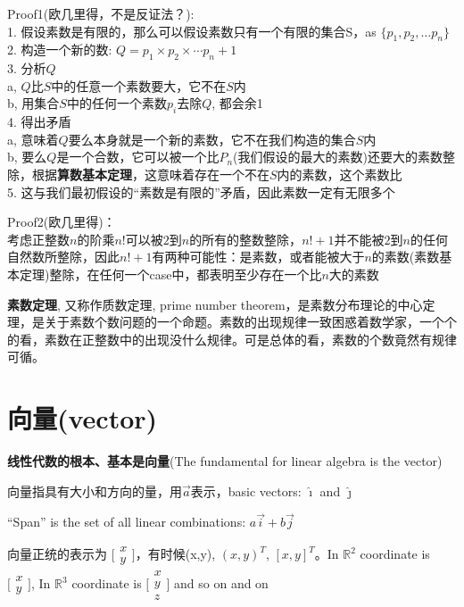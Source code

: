 \documentclass[../main.tex]{subfiles}
\begin{document}
Proof1(欧几里得，不是反证法？):\\
1. 假设素数是有限的，那么可以假设素数只有一个有限的集合S，as $\{p_1, p_2, \ldots p_n\}$\\
2. 构造一个新的数: $Q=p_1\times p_2\times \cdots p_n+1$\\
3. 分析$Q$\\
\forceindent a, $Q$比$S$中的任意一个素数要大，它不在$S$内\\
\forceindent b, 用集合$S$中的任何一个素数$p_i$去除$Q$, 都会余1\\
4. 得出矛盾\\
\forceindent a, 意味着$Q$要么本身就是一个新的素数，它不在我们构造的集合$S$内\\
\forceindent b, 要么$Q$是一个合数，它可以被一个比$P_n$(我们假设的最大的素数)还要大的素数整除，根据\textbf{算数基本定理}，这意味着存在一个不在$S$内的素数，这个素数比\\
5. 这与我们最初假设的“素数是有限的”矛盾，因此素数一定有无限多个

Proof2(欧几里得)：\\
考虑正整数$n$的阶乘$n!$可以被$2$到$n$的所有的整数整除，$n!+1$并不能被$2$到$n$的任何自然数所整除，因此$n!+1$有两种可能性：是素数，或者能被大于$n$的素数(素数基本定理)整除，在任何一个case中，都表明至少存在一个比$n$大的素数

\textbf{素数定理}, 又称作质数定理, prime number theorem，是素数分布理论的中心定理，是关于素数个数问题的一个命题。素数的出现规律一致困惑着数学家，一个个的看，素数在正整数中的出现没什么规律。可是总体的看，素数的个数竟然有规律可循。

\clearpage
\section{向量(vector)}

\textbf{线性代数的根本、基本是向量}(The fundamental for linear algebra is the vector)

向量指具有大小和方向的量，用$\vec{a}$表示，basic vectors: $\hat{\imath}$ and $\hat{\jmath}$

``Span'' is the set of all linear combinations: $a\vec{i}+b\vec{j}$

向量正统的表示为 $\bigl[ \begin{smallmatrix}  x\\y \end{smallmatrix} \bigr]$，有时候(x,y), $(x,y)^{T}$, $[x,y]^T$。In $\mathbb{R}^2$ coordinate is $\bigl[ \begin{smallmatrix} x\\y \end{smallmatrix} \bigr]$, In $\mathbb{R}^3$ coordinate is $ \bigl[ \begin{smallmatrix} x\\y\\z \end{smallmatrix} \bigr]$ and so on and on
\end{document}
